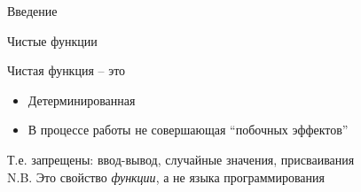 



%
%


\begin{frame}{Введение}
\begin{center}
\end{center}
\end{frame}

\begin{frame}{Чистые функции}
\begin{definition}{Чистая функция -- это}
  \begin{itemize}
    \item Детерминированная
    \item В процессе работы не совершающая ``побочных эффектов''
  \end{itemize}
\end{definition}
Т.е. запрещены: ввод-вывод, случайные значения, присваивания\\

N.B. Это свойство \emph{функции}, а не языка программирования
\end{frame}

